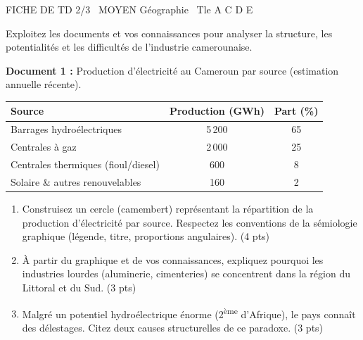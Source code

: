 \documentclass[11pt]{article}
\begin{document}
\begin{tcolorbox}[enhanced,colback=popink,colframe=popink,arc=10pt,boxrule=0pt,left=12pt,right=12pt,top=9pt,bottom=9pt]
{\color{white}\popxbold\small FICHE DE TD 2/3 \textbullet\ MOYEN \hfill Géographie \textbullet\ Tle A C D E\par}
\end{tcolorbox}
\vspace{4pt}
\noindent Exploitez les documents et vos connaissances pour analyser la structure, les potentialités et les difficultés de l'industrie camerounaise.

\begin{exercice}
\textbf{Document 1 :} Production d'électricité au Cameroun par source (estimation annuelle récente).\\
\begin{tabular}{lcc}
\toprule
Source & Production (GWh) & Part (\%)\\
\midrule
Barrages hydroélectriques & 5\,200 & 65\\
Centrales à gaz & 2\,000 & 25\\
Centrales thermiques (fioul/diesel) & 600 & 8\\
Solaire \& autres renouvelables & 160 & 2\\
\bottomrule
\end{tabular}
\begin{enumerate}
\item Construisez un cercle (camembert) représentant la répartition de la production d'électricité par source. Respectez les conventions de la sémiologie graphique (légende, titre, proportions angulaires). \hfill (4 pts)
\item À partir du graphique et de vos connaissances, expliquez pourquoi les industries lourdes (aluminerie, cimenteries) se concentrent dans la région du Littoral et du Sud. \hfill (3 pts)
\item Malgré un potentiel hydroélectrique énorme (2\textsuperscript{ème} d'Afrique), le pays connaît des délestages. Citez deux causes structurelles de ce paradoxe. \hfill (3 pts)
\end{enumerate}
\end{exercice}
\end{document}
